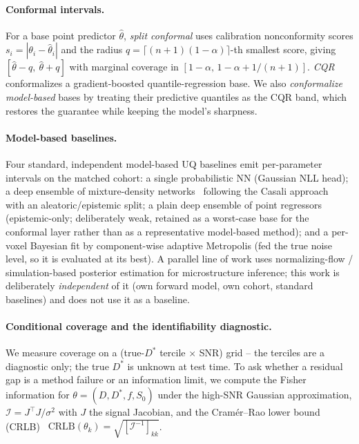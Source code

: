 \documentclass[11pt]{article}
\newcommand{\Dstar}{D^{*}}
\begin{document}
\paragraph{Conformal intervals.}
For a base point predictor $\hat\theta$, \emph{split conformal} uses calibration
nonconformity scores $s_i = |\theta_i - \hat\theta_i|$ and the radius
$q=\lceil(n{+}1)(1-\alpha)\rceil$-th smallest score, giving
$[\hat\theta - q,\ \hat\theta + q]$ with marginal coverage in
$[1-\alpha,\,1-\alpha+1/(n{+}1)]$. \emph{CQR}~\citep{romano2019} conformalizes a
gradient-boosted quantile-regression base. We also \emph{conformalize model-based}
bases by treating their predictive quantiles as the CQR band, which restores the
guarantee while keeping the model's sharpness.

\paragraph{Model-based baselines.}
Four standard, independent model-based UQ baselines emit per-parameter intervals on
the matched cohort: a single probabilistic NN (Gaussian NLL head); a deep ensemble
of mixture-density networks~\citep{bishop1994,lakshminarayanan2017} following the
Casali approach~\citep{casali2026} with an aleatoric/epistemic split; a plain deep
ensemble of point regressors (epistemic-only; deliberately weak, retained as a
worst-case base for the conformal layer rather than as a representative model-based
method); and a per-voxel
Bayesian fit by component-wise adaptive Metropolis (fed the true noise level, so it
is evaluated at its best). A parallel line of work uses normalizing-flow /
simulation-based posterior estimation for microstructure inference; this work is
deliberately \emph{independent} of it (own forward model, own cohort, standard
baselines) and does not use it as a baseline.

\paragraph{Conditional coverage and the identifiability diagnostic.}
We measure coverage on a (true-$\Dstar$ tercile $\times$ SNR) grid -- the terciles
are a diagnostic only; the true $\Dstar$ is unknown at test time. To ask whether a
residual gap is a method failure or an information limit, we compute the Fisher
information for $\theta=(D,\Dstar,f,S_0)$ under the high-SNR Gaussian approximation,
$\mathcal{I}=J^\top J/\sigma^2$ with $J$ the signal Jacobian, and the
Cram\'er--Rao lower bound (CRLB)~\citep{cramer1946}
$\mathrm{CRLB}(\theta_k)=\sqrt{[\mathcal{I}^{-1}]_{kk}}$.
\end{document}
